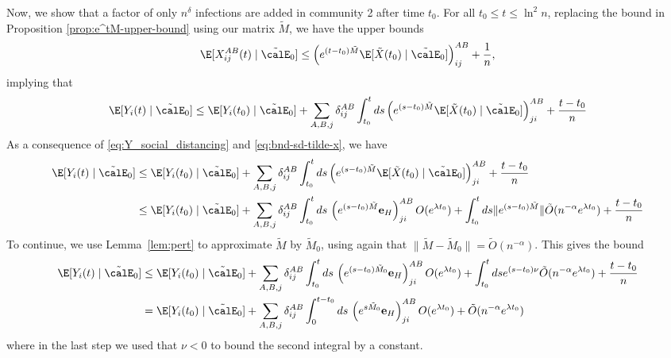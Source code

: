 \documentclass[11pt]{article}
\begin{document}
Now, we show that a factor of only $n^{\delta}$ infections are added in community 2 after time $t_0$. For all $t_0 \leq t \leq \ln^2 n$, replacing the bound in Proposition \ref{prop:e^tM-upper-bound} using our matrix  $\tilde M$, we have the upper bounds
\begin{equation}\label{eq:tilde_m_social_distancing}
  \E[X_{ij}^{AB}(t) \mid \tilde \calE_0] \leq \left(e^{(t-t_0) \tilde M}\E[\tilde X(t_0) \mid \tilde \calE_0]\right)_{ij}^{AB} + \frac{1}{n},
\end{equation}
implying that
\begin{equation}\label{eq:Y_social_distancing}
   \E[Y_i(t) \mid \tilde \calE_0]\leq \E[Y_i(t_0) \mid \tilde \calE_0]+
    \sum_{A,B,j}\delta_{ij}^{AB}\int_{t_0}^tds \left(e^{(s-t_0)\tilde M}\E[\tilde X(t_0) \mid \tilde \calE_0]\right)_{ji}^{AB}    +\frac{t-t_0}n\\
\end{equation}
As a consequence of \eqref{eq:Y_social_distancing} and \eqref{eq:bnd-sd-tilde-x}, we have
\begin{equation}
 \label{eq:Y_sd_integral_ub}
\begin{aligned}
   \E[Y_i(t) \mid \tilde \calE_0]&\leq \E[Y_i(t_0) \mid \tilde \calE_0]+
    \sum_{A,B,j}\delta_{ij}^{AB}\int_{t_0}^tds \left(e^{(s-t_0)\tilde M}\E[\tilde X(t_0) \mid \tilde \calE_0]\right)_{ji}^{AB}    +\frac{t-t_0}n\\
    &\leq \E[Y_i(t_0) \mid \tilde \calE_0] + \sum_{A, B, j} \delta_{ij}^{AB} \int_{t_0}^t ds \, \left(e^{(s-t_0)\tilde M}\mathbf e_H\right)_{ji}^{AB} O(e^{\lambda t_0}) + 
    \int_{t_0}^t ds \|e^{(s-t_0)\tilde M}\|
    \tilde O(n^{-\alpha}e^{\lambda t_0})+\frac{t-t_0}n
\end{aligned}
\end{equation}
To continue, we use Lemma~\ref{lem:pert} to approximate $\tilde M$ by $\tilde M_0$, using again that $\|\tilde M-\tilde M_0\|=\tilde O(n^{-\alpha})$.  This gives the bound
\begin{equation}
 \label{eq:Y_sd_integral_ub-2}
\begin{aligned}
   \E[Y_i(t) \mid \tilde \calE_0]
    &\leq \E[Y_i(t_0) \mid \tilde \calE_0] + \sum_{A, B, j} \delta_{ij}^{AB} \int_{t_0}^t ds \, \left(e^{(s-t_0)\tilde M_0}\mathbf e_H\right)_{ji}^{AB} O(e^{\lambda t_0}) 
       + \int_{t_0}^t ds e^{(s-t_0)\nu}\tilde O(n^{-\alpha} e^{\lambda t_0}) 
   + \frac{t-t_0}n\\
   &=\E[Y_i(t_0) \mid \tilde \calE_0] + \sum_{A, B, j} \delta_{ij}^{AB} \int_{0}^{t-t_0} ds \, \left(e^{s\tilde M_0}\mathbf e_H\right)_{ji}^{AB} O(e^{\lambda t_0}) 
       + \tilde O(n^{-\alpha} e^{\lambda t_0}) 
  \end{aligned}
\end{equation}
where in the last step we used that $\nu<0$ to bound the second integral by a constant.
\end{document}
